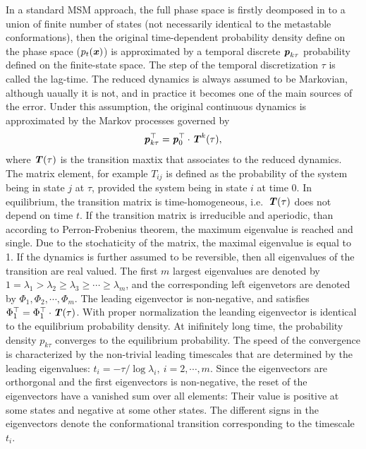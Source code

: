 \documentclass[epjST]{svjour}
\newcommand{\vect}[1]{\textbf{\textit{#1}}}
\begin{document}
In a standard MSM approach, the full phase space is firstly deomposed in to a union of finite number of states
(not necessarily identical to the metastable conformations),
then
the original time-dependent probability density define on the phase
space ($p_t(\vect x)$) is approximated by a temporal discrete $\vect p_{k\tau}$ probability defined on the finite-state space.
The step of the temporal discretization $\tau$ is called the lag-time.
The reduced
dynamics is always assumed to be Markovian,
although uaually it is not,  and in practice it becomes one of the main sources of the error.
Under this assumption, the original continuous dynamics is approximated by the Markov processes governed by
\begin{align}
\vect p^\top_{k\tau} = \vect p^\top_0 \cdot \vect T^k(\tau),
\end{align}
where $\vect T(\tau)$ is the transition maxtix that
associates to the reduced dynamics. The matrix element, for example $T_{ij}$
is defined as the probability of the system being in state
$j$ at $\tau$,  provided the system being in state $i$ at time 0.
In equilibrium, the transition matrix is time-homogeneous, i.e.~$\vect T(\tau)$ does not depend on time $t$.
If the transition matrix is irreducible and aperiodic, than according to Perron-Frobenius theorem, the maximum
eigenvalue is reached and single. Due to the stochaticity of the matrix, the maximal eigenvalue is equal to 1.
If the dynamics
is further assumed to be reversible, then all eigenvalues of the transition are
real valued.
The first $m$ largest eigenvalues are denoted by $1 = \lambda_1 > \lambda_2 \geq \lambda_3 \geq \cdots \geq \lambda_m$, and
the corresponding left eigenvetors are denoted by $\Phi_1, \Phi_2, \cdots, \Phi_m$.
The leading eigenvector is non-negative, and satisfies $\Phi^\top_1 = \Phi^\top_1\cdot\vect T(\tau)$.
With proper normalization the leanding eigenvector is identical to the 
equilibrium probability density.
At inifinitely long time, the probability density $p_{k\tau}$ converges to the equilibrium probability.
The speed of the convergence is characterized by the non-trivial leading timescales that are
determined by the leading eigenvalues:  $t_i  = -{\tau}/{\log\lambda_i}, \ i=2, \cdots, m$.
Since the eigenvectors are orthorgonal and the first eigenvectors is non-negative, the reset
of the eigenvectors have a vanished sum over all elements: Their
value is positive at some states and negative at some other states.
The different signs in the eigenvectors denote the conformational transition corresponding to the
timescale $t_i$.
\end{document}
